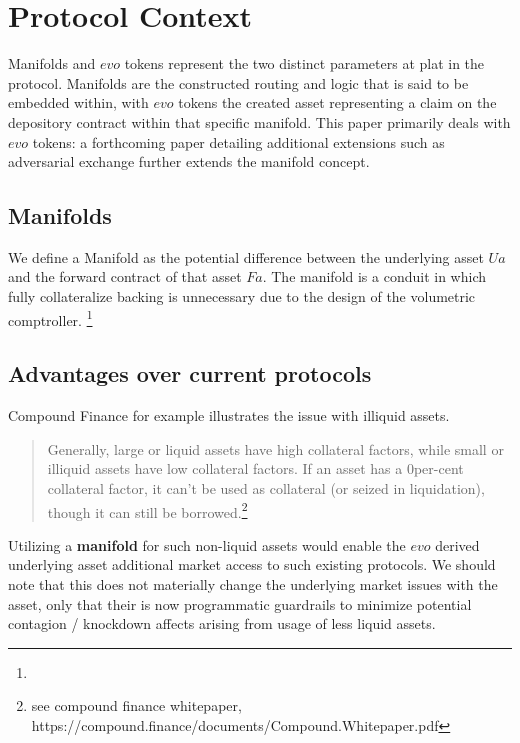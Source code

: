 \newpage


\section{Protocol Context}

Manifolds and $evo$ tokens represent the two distinct parameters at plat in the protocol. Manifolds are the constructed routing and logic that is said to be embedded  within, with $evo$ tokens the created asset representing a claim on the depository contract within that specific manifold. 
This paper primarily deals with $evo$ tokens: a forthcoming paper detailing additional extensions such as adversarial exchange further extends the manifold concept.


\subsection{Manifolds}
We define a Manifold as the  potential difference between the underlying asset $Ua$ and the forward contract of that asset $Fa$. The manifold is a conduit in which fully collateralize backing is unnecessary due to the design of the volumetric comptroller. \footnote{}

\subsection{Advantages over current protocols}

Compound Finance for example illustrates the issue with {illiquid assets}. 

\begin{quote}
    Generally, large or liquid assets have high collateral factors, while small or illiquid assets have low collateral factors. If an asset has a 0per-cent collateral factor, it can't be used as collateral (or seized in liquidation), though it can still be borrowed.\footnote{see compound finance whitepaper, https://compound.finance/documents/Compound.Whitepaper.pdf}
\end{quote}

Utilizing a \textbf{manifold} for such non-liquid assets would enable the $ evo $ derived underlying asset additional market access to such existing protocols. We should note that this does not materially change the underlying market issues with the asset, only that their is now programmatic guardrails to minimize potential contagion / knockdown affects arising from usage of less liquid  assets.




